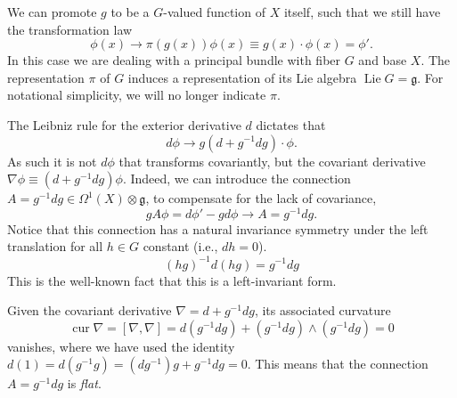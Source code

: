 \documentclass[onecolumn]{article}
\theoremstyle{theorem}
\theoremstyle{remark}
\theoremstyle{example}
\theoremstyle{definition}
\numberwithin{equation}{section}
\begin{document}
We can promote $g$ to be a $G$-valued function of $X$ itself, such that we still have the transformation law
\begin{equation}
    \phi(x)\rightarrow \pi({g(x)})\phi (x) \equiv g(x)\cdot \phi(x) =\phi'.\nonumber
\end{equation}
{In} this case we are dealing with a principal bundle with fiber $G$ and base $X$. {The representation $\pi$ of $G$ induces a representation of its Lie algebra $\operatorname{Lie}G=\mathfrak{g}$. For notational simplicity, we will no longer indicate $\pi$.}%

The Leibniz rule for the exterior derivative $d$ dictates that 
\begin{equation}\label{d-cov}
    d\phi \rightarrow g(d+g^{-1}dg)\cdot \phi.\nonumber 
\end{equation}
{As} such it is not $d\phi$ that transforms covariantly, but the covariant derivative  $\nabla\phi\equiv (d+ g^{-1} dg)\phi$. Indeed, we can introduce the connection $A=g^{-1}dg\in \Omega^1(X)\otimes\mathfrak{g}$, to compensate for the lack of {covariance,} %
  \begin{equation}
    gA \phi = d \phi'- gd\phi  \rightarrow A = g^{-1} d g. \label{lack}
\end{equation}
{Notice} that this connection has a natural invariance symmetry under the left translation for all $h\in G$ constant (i.e., $dh=0$).  
\begin{equation}
(hg)^{-1} d(hg ) = g ^{-1}dg\label{global0form}
\end{equation}
{This} is the well-known fact that  this is a left-invariant form. 






Given the covariant derivative $\nabla = d+g^{-1}dg$, its associated curvature
\begin{equation}
    \operatorname{cur}\nabla  = [\nabla,\nabla] = d(g^{-1}dg) + (g^{-1}dg)\wedge (g^{-1}dg) = 0\nonumber%
\end{equation}
vanishes, where we have used the identity $d(1) = d(g^{-1}g) = (dg^{-1})g+g^{-1}dg = 0$. This means that the connection $A=g^{-1}dg$ is \textit{{flat}}. 
\end{document}
